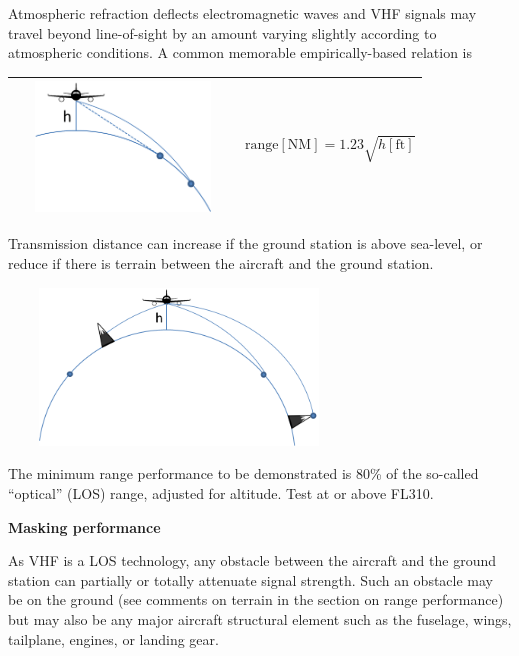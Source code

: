 \documentclass[
]{book}
\begin{document}
Atmospheric refraction deflects electromagnetic waves and VHF signals may travel
beyond line-of-sight by an amount varying slightly according to atmospheric
conditions. A common memorable empirically-based relation is

\begin{longtable}[]{@{}rl@{}}
\toprule
\endhead
\begin{minipage}[t]{0.47\columnwidth}\raggedleft
\includegraphics[width=2.25in,height=1.36406in]{media/20/image2.png}\strut
\end{minipage} & \begin{minipage}[t]{0.47\columnwidth}\raggedright
\[\text{range} \left[ \text{NM} \right] = 1.23\sqrt{h \left[ \text{ft} \right]}\]\strut
\end{minipage}\tabularnewline
\bottomrule
\end{longtable}

Transmission distance can increase if the ground station is above sea-level, or
reduce if there is terrain between the aircraft and the ground station.

\includegraphics[width=3.5625in,height=1.64931in]{media/20/image3.png}

The minimum range performance to be demonstrated is 80\% of the so-called
``optical'' (LOS) range, adjusted for altitude. Test at or above FL310.

\textbf{Masking performance}

As VHF is a LOS technology, any obstacle between the aircraft and the ground
station can partially or totally attenuate signal strength. Such an obstacle
may be on the ground (see comments on terrain in the section on range
performance) but may also be any major aircraft structural element such as the
fuselage, wings, tailplane, engines, or landing gear.
\end{document}
